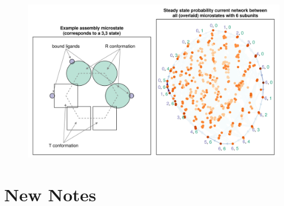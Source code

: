 \documentclass[11pt]{article}
\begin{document}
\begin{figure}[H]
	\centering
	\includegraphics[width=\textwidth]{figure.png}
	\caption{ }\label{fig:onlyfigure}
\end{figure}

\newpage
\printbibliography

%
\newpage
\section{New Notes}
\end{document}
